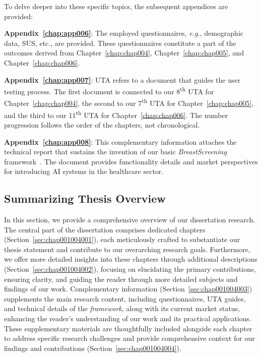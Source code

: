 \vspace{2.00mm}

\noindent
To delve deeper into these specific topics, the subsequent appendices are provided:

\vspace{2.00mm}

\noindent
{\bf Appendix~\ref{chap:app006}}:
The employed questionnaires, {\it e.g.}, demographic data, \acs{SUS}, etc., are provided.
These questionnaires constitute a part of the outcomes derived from Chapter~\ref{chap:chap004}, Chapter~\ref{chap:chap005}, and Chapter~\ref{chap:chap006}.

\vspace{2.00mm}

\noindent
{\bf Appendix~\ref{chap:app007}}:
\ac{UTA} refers to a document that guides the user testing process.
The first document is connected to our 8\textsuperscript{th} \ac{UTA} for Chapter~\ref{chap:chap004}, the second to our 7\textsuperscript{th} \ac{UTA} for Chapter~\ref{chap:chap005}, and the third to our 11\textsuperscript{th} \ac{UTA} for Chapter~\ref{chap:chap006}.
The number progression follows the order of the chapters, not chronological.


\vspace{2.00mm}

\noindent
{\bf Appendix~\ref{chap:app008}}:
This complementary information attaches the technical report that sustains the invention of our basic {\it BreastScreening} framework~\cite{10.1145/3399715.3399744, WO2022071818A1}.
The document provides functionality details and market perspectives for introducing \ac{AI} systems in the healthcare sector.

\subsection{Summarizing Thesis Overview}
\label{sec:chap001004005}

In this section, we provide a comprehensive overview of our dissertation research. The central part of the dissertation comprises dedicated chapters (Section~\ref{sec:chap001004001}), each meticulously crafted to substantiate our thesis statement and contribute to our overarching research goals.
Furthermore, we offer more detailed insights into these chapters through additional descriptions (Section~\ref{sec:chap001004002}), focusing on elucidating the primary contributions, ensuring clarity, and guiding the reader through more detailed subjects and findings of our work.
Complementary information (Section~\ref{sec:chap001004003}) supplements the main research content, including questionnaires, \ac{UTA} guides, and technical details of the {\it framework}, along with its current market status, enhancing the reader's understanding of our work and its practical applications.
These supplementary materials are thoughtfully included alongside each chapter to address specific research challenges and provide comprehensive context for our findings and contributions (Section~\ref{sec:chap001004004}).